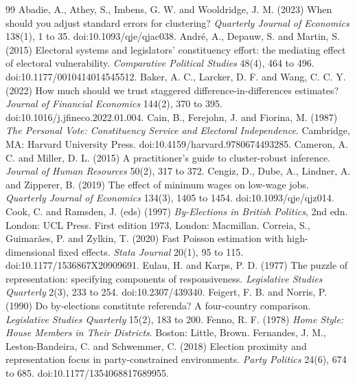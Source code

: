 \documentclass[11pt,a4paper]{article}
\begin{document}
\begin{thebibliography}{99}
 Abadie, A., Athey, S., Imbens, G. W. and Wooldridge, J. M. (2023) When should you adjust standard errors for clustering? \textit{Quarterly Journal of Economics} 138(1), 1 to 35. doi:10.1093/qje/qjac038.
 Andr\'e, A., Depauw, S. and Martin, S. (2015) Electoral systems and legislators' constituency effort: the mediating effect of electoral vulnerability. \textit{Comparative Political Studies} 48(4), 464 to 496. doi:10.1177/0010414014545512.
 Baker, A. C., Larcker, D. F. and Wang, C. C. Y. (2022) How much should we trust staggered difference-in-differences estimates? \textit{Journal of Financial Economics} 144(2), 370 to 395. doi:10.1016/j.jfineco.2022.01.004.
 Cain, B., Ferejohn, J. and Fiorina, M. (1987) \textit{The Personal Vote: Constituency Service and Electoral Independence}. Cambridge, MA: Harvard University Press. doi:10.4159/harvard.9780674493285.
 Cameron, A. C. and Miller, D. L. (2015) A practitioner's guide to cluster-robust inference. \textit{Journal of Human Resources} 50(2), 317 to 372.
 Cengiz, D., Dube, A., Lindner, A. and Zipperer, B. (2019) The effect of minimum wages on low-wage jobs. \textit{Quarterly Journal of Economics} 134(3), 1405 to 1454. doi:10.1093/qje/qjz014.
 Cook, C. and Ramsden, J. (eds) (1997) \textit{By-Elections in British Politics}, 2nd edn. London: UCL Press. First edition 1973, London: Macmillan.
 Correia, S., Guimar\~aes, P. and Zylkin, T. (2020) Fast Poisson estimation with high-dimensional fixed effects. \textit{Stata Journal} 20(1), 95 to 115. doi:10.1177/1536867X20909691.
 Eulau, H. and Karps, P. D. (1977) The puzzle of representation: specifying components of responsiveness. \textit{Legislative Studies Quarterly} 2(3), 233 to 254. doi:10.2307/439340.
 Feigert, F. B. and Norris, P. (1990) Do by-elections constitute referenda? A four-country comparison. \textit{Legislative Studies Quarterly} 15(2), 183 to 200.
 Fenno, R. F. (1978) \textit{Home Style: House Members in Their Districts}. Boston: Little, Brown.
 Fernandes, J. M., Leston-Bandeira, C. and Schwemmer, C. (2018) Election proximity and representation focus in party-constrained environments. \textit{Party Politics} 24(6), 674 to 685. doi:10.1177/1354068817689955.

\end{thebibliography}
\end{document}
